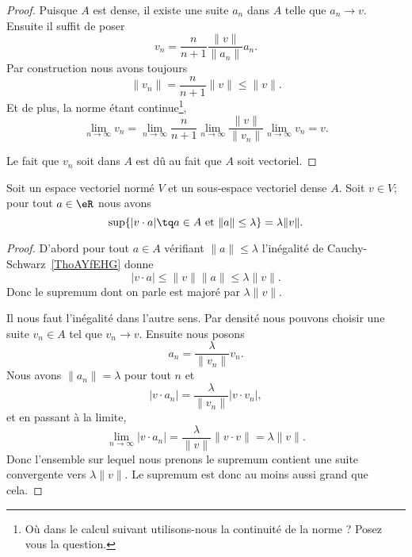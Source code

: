 \begin{proof}
	Puisque \( A\) est dense, il existe une suite \( a_n\) dans \( A\) telle que \( a_n\to v\). Ensuite il suffit de poser
	\begin{equation}
		v_n=\frac{ n }{ n+1 }\frac{ \| v \| }{ \| a_n \| }a_n.
	\end{equation}
	Par construction nous avons toujours
	\begin{equation}
		\| v_n \|=\frac{ n }{ n+1 }\| v \|\leq \| v \|.
	\end{equation}
	Et de plus, la norme étant continue\footnote{Où dans le calcul suivant utilisons-nous la continuité de la norme ? Posez vous la question.},
	\begin{equation}
		\lim_{n\to \infty} v_n=\lim_{n\to \infty} \frac{ n }{ n+1 }\lim_{n\to \infty} \frac{ \| v \| }{ \| v_n \| }\lim_{n\to \infty} v_n=v.
	\end{equation}

	Le fait que \( v_n\) soit dans \( A\) est dû au fait que \( A\) soit vectoriel.
\end{proof}

\begin{proposition}     \label{PROPooVEMGooYKhMFy}
	Soit un espace vectoriel normé \( V\) et un sous-espace vectoriel dense \( A\). Soit \( v\in V\); pour tout \( a\in \eR\) nous avons
	\begin{equation}
		\sup\{ | v\cdot a |\tq a\in A\text{ et }\| a \|\leq \lambda \}=\lambda\| v \|.
	\end{equation}
\end{proposition}

\begin{proof}
	D'abord pour tout \( a\in A\) vérifiant \( \| a \|\leq \lambda\) l'inégalité de Cauchy-Schwarz~\ref{ThoAYfEHG} donne
	\begin{equation}
		| v\cdot a |\leq \| v \|\| a \|\leq \lambda\| v \|.
	\end{equation}
	Donc le supremum dont on parle est majoré par \( \lambda\| v \|\).

	Il nous faut l'inégalité dans l'autre sens. Par densité nous pouvons choisir une suite \( v_n\in A\) tel que \( v_n\to v\). Ensuite nous posons
	\begin{equation}
		a_n=\frac{ \lambda }{ \| v_n \| }v_n.
	\end{equation}
	Nous avons \( \| a_n \|=\lambda\) pour tout \( n\) et
	\begin{equation}
		| v\cdot a_n |=\frac{ \lambda }{ \| v_n \| }| v\cdot v_n |,
	\end{equation}
	et en passant à la limite,
	\begin{equation}
		\lim_{n\to \infty} | v\cdot a_n |=\frac{ \lambda }{ \| v \| }\| v\cdot v \|=\lambda\| v \|.
	\end{equation}
	Donc l'ensemble sur lequel nous prenons le supremum contient une suite convergente vers \( \lambda\| v \|\). Le supremum est donc au moins aussi grand que cela.
\end{proof}

